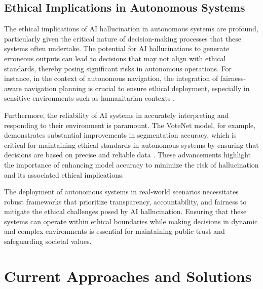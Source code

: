 \subsection{Ethical Implications in Autonomous Systems} \label{subsec:Ethical Implications in Autonomous Systems}

The ethical implications of AI hallucination in autonomous systems are profound, particularly given the critical nature of decision-making processes that these systems often undertake. The potential for AI hallucinations to generate erroneous outputs can lead to decisions that may not align with ethical standards, thereby posing significant risks in autonomous operations. For instance, in the context of autonomous navigation, the integration of fairness-aware navigation planning is crucial to ensure ethical deployment, especially in sensitive environments such as humanitarian contexts \cite{brandao2020fairnavigationplanninghumanitarian}. 



Furthermore, the reliability of AI systems in accurately interpreting and responding to their environment is paramount. The VoteNet model, for example, demonstrates substantial improvements in segmentation accuracy, which is critical for maintaining ethical standards in autonomous systems by ensuring that decisions are based on precise and reliable data \cite{meyarian2023votingnetworkcontourlevee}. These advancements highlight the importance of enhancing model accuracy to minimize the risk of hallucination and its associated ethical implications.



The deployment of autonomous systems in real-world scenarios necessitates robust frameworks that prioritize transparency, accountability, and fairness to mitigate the ethical challenges posed by AI hallucination. Ensuring that these systems can operate within ethical boundaries while making decisions in dynamic and complex environments is essential for maintaining public trust and safeguarding societal values.












\section{Current Approaches and Solutions} \label{sec:Current Approaches and Solutions}

